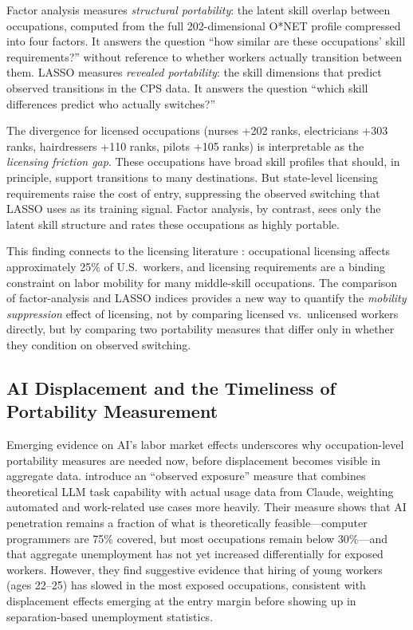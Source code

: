 \documentclass[12pt]{article}
\begin{document}
Factor analysis measures \emph{structural portability}: the latent skill overlap between occupations, computed from the full 202-dimensional O*NET profile compressed into four factors. It answers the question ``how similar are these occupations' skill requirements?'' without reference to whether workers actually transition between them. LASSO measures \emph{revealed portability}: the skill dimensions that predict observed transitions in the CPS data. It answers the question ``which skill differences predict who actually switches?''

The divergence for licensed occupations (nurses +202 ranks, electricians +303 ranks, hairdressers +110 ranks, pilots +105 ranks) is interpretable as the \emph{licensing friction gap}. These occupations have broad skill profiles that should, in principle, support transitions to many destinations. But state-level licensing requirements raise the cost of entry, suppressing the observed switching that LASSO uses as its training signal. Factor analysis, by contrast, sees only the latent skill structure and rates these occupations as highly portable.

This finding connects to the licensing literature \citep{kleiner2013}: occupational licensing affects approximately 25\% of U.S.\ workers, and licensing requirements are a binding constraint on labor mobility for many middle-skill occupations. The comparison of factor-analysis and LASSO indices provides a new way to quantify the \emph{mobility suppression} effect of licensing, not by comparing licensed vs.\ unlicensed workers directly, but by comparing two portability measures that differ only in whether they condition on observed switching.

\subsection{AI Displacement and the Timeliness of Portability Measurement}

Emerging evidence on AI's labor market effects underscores why occupation-level portability measures are needed now, before displacement becomes visible in aggregate data. \citet{massenkoff2026} introduce an ``observed exposure'' measure that combines theoretical LLM task capability \citep{eloundou2023} with actual usage data from Claude, weighting automated and work-related use cases more heavily. Their measure shows that AI penetration remains a fraction of what is theoretically feasible---computer programmers are 75\% covered, but most occupations remain below 30\%---and that aggregate unemployment has not yet increased differentially for exposed workers. However, they find suggestive evidence that hiring of young workers (ages 22--25) has slowed in the most exposed occupations, consistent with displacement effects emerging at the entry margin before showing up in separation-based unemployment statistics.
\end{document}
